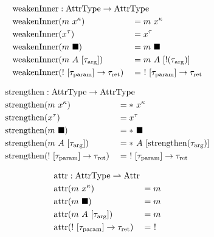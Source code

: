 \newcommand{\weakenInner}{\mathrm{weakenInner}}

\begin{alignat*}{3}
	\weakenInner &: \mathrlap{\AttrType \to \AttrType} \\
	\weakenInner&(m\ x^\kappa) &&= m\ x^\kappa \\
	\weakenInner&(x^\tau) &&= x^\tau \\
	\weakenInner&(m\ \blacksquare) &&= m\ \blacksquare \\
	\weakenInner&(m\ A\ [\tau_\arrg]) &&= m\ A\ [!(\tau_\arrg)] \\
	\weakenInner&(!\ [\tau_\param] \to \tau_\ret) &&=\ !\ [\tau_\param] \to \tau_\ret \\
\end{alignat*}

\newcommand{\strengthen}{\mathrm{strengthen}}

\begin{alignat*}{3}
  \strengthen &: \mathrlap{\AttrType \to \AttrType} \\
  \strengthen&(m\ x^\kappa) &&= *\ x^\kappa \\
  \strengthen&(x^\tau) &&= x^\tau \\
  \strengthen&(m\ \blacksquare) &&= *\ \blacksquare \\
  \strengthen&(m\ A\ [\tau_\arrg]) &&= *\ A\ [\strengthen(\tau_\arrg)] \\
  \strengthen&(!\ [\tau_\param] \to \tau_\ret) &&=\ !\ [\tau_\param] \to \tau_\ret \\
\end{alignat*}

\newcommand{\attr}{\mathrm{attr}}

\begin{alignat*}{3}
  \attr &: \mathrlap{\AttrType \rightharpoonup \Attr} \\
  \attr&(m\ x^\kappa) &&= m \\
  \attr&(m\ \blacksquare) &&= m \\
  \attr&(m\ A\ [\tau_\arrg]) &&= m \\
  \attr&(!\ [\tau_\param] \to \tau_\ret) &&=\ ! \\
\end{alignat*}

